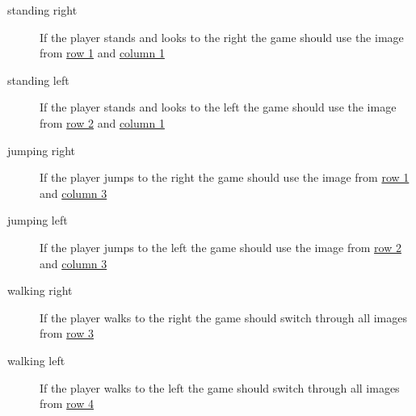 \begin{description}
  \item[standing right] If the player stands and looks to the right the game should use the image from \ul{row 1} and \ul{column 1}
  \item[standing left] If the player stands and looks to the left the game should use the image from \ul{row 2} and \ul{column 1}
  \item[jumping right] If the player jumps to the right the game should use the image from \ul{row 1} and \ul{column 3}
  \item[jumping left] If the player jumps to the left the game should use the image from \ul{row 2} and \ul{column 3}
  \item[walking right] If the player walks to the right the game should switch through all images from \ul{row 3}
  \item[walking left] If the player walks to the left the game should switch through all images from \ul{row 4}
\end{description}

\newpage
